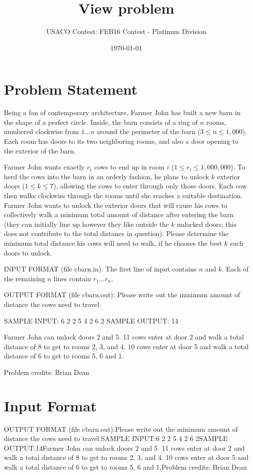 \documentclass[12pt]{article}
\title{View problem}
\author{USACO Contest: FEB16 Contest - Platinum Division}
\date{\today}
\begin{document}
\maketitle

\section*{Problem Statement}

Being a fan of contemporary architecture, Farmer John has built a new barn in
the shape of a perfect circle.  Inside, the barn consists of a ring of $n$
rooms,  numbered clockwise from $1 \ldots n$ around the perimeter of the barn
($3 \leq n \leq 1,000$).  Each room has doors to its two neighboring rooms, and
also a door opening to the exterior of the barn.

Farmer John wants exactly $r_i$ cows to end up in room $i$
($1 \leq r_i \leq 1,000,000$). To herd the cows into the barn in an orderly
fashion, he plans to unlock $k$ exterior doors ($1 \leq k \leq 7$), allowing the
cows to enter through only those doors. Each cow then walks clockwise through
the rooms until she reaches a suitable destination.  Farmer John wants to unlock
the exterior doors that will cause his cows to collectively walk a minimum total
amount of distance after entering the barn (they can initially line up however
they like outside the $k$ unlocked doors; this does not contribute to the total
distance in question).  Please determine the minimum total distance his cows
will need to walk, if he chooses the best $k$ such doors to unlock.  

INPUT FORMAT (file cbarn.in):
The first line of input contains $n$ and $k$.  Each of the remaining $n$ lines
contain $r_1 \ldots r_n$.

OUTPUT FORMAT (file cbarn.out):
Please write out the minimum amount of distance the cows need to travel.

SAMPLE INPUT:
6 2
2
5
4
2
6
2
SAMPLE OUTPUT: 
14

Farmer John can unlock doors 2 and 5.  11 cows enter at door 2 and walk a total
distance of 8 to get to rooms 2, 3, and 4.  10 cows enter at door 5 and walk a
total distance of 6 to get to rooms 5, 6 and 1.

Problem credits: Brian Dean



\section*{Input Format}
OUTPUT FORMAT (file cbarn.out):Please write out the minimum amount of distance the cows need to travel.SAMPLE INPUT:6 2
2
5
4
2
6
2SAMPLE OUTPUT:14Farmer John can unlock doors 2 and 5.  11 cows enter at door 2 and walk a total
distance of 8 to get to rooms 2, 3, and 4.  10 cows enter at door 5 and walk a
total distance of 6 to get to rooms 5, 6 and 1.Problem credits: Brian Dean
\end{document}
